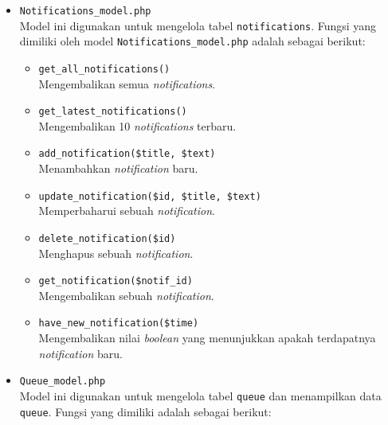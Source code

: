 \begin{itemize}
	\item \verb|Notifications_model.php| \\
	      Model ini digunakan untuk mengelola tabel \verb|notifications|. Fungsi yang dimiliki oleh model \verb|Notifications_model.php| adalah sebagai berikut:

	      \begin{itemize}
		      \item \verb|get_all_notifications()| \\
		            Mengembalikan semua \textit{notifications}.
		      \item \verb|get_latest_notifications()| \\
		            Mengembalikan 10 \textit{notifications} terbaru.
		      \item \verb|add_notification($title, $text)| \\
		            Menambahkan \textit{notification} baru.
		      \item \verb|update_notification($id, $title, $text)| \\
		            Memperbaharui sebuah \textit{notification}.
		      \item \verb|delete_notification($id)| \\
		            Menghapus sebuah \textit{notification}.

		            \newpage

		      \item \verb|get_notification($notif_id)| \\
		            Mengembalikan sebuah \textit{notification}.
		      \item \verb|have_new_notification($time)| \\
		            Mengembalikan nilai \textit{boolean} yang menunjukkan apakah terdapatnya \textit{notification} baru.
	      \end{itemize}

	\item \verb|Queue_model.php| \\
	      Model ini digunakan untuk mengelola tabel \verb|queue| dan menampilkan data \verb|queue|. Fungsi yang dimiliki adalah sebagai berikut:


\end{itemize}
